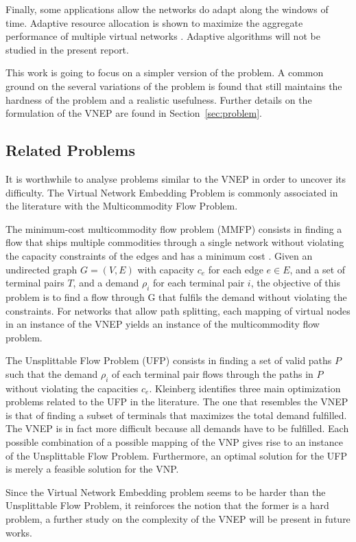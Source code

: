 Finally, some applications allow the networks do adapt along the windows of time. Adaptive resource allocation is shown to maximize the aggregate performance of multiple virtual networks \cite{He:2008}. Adaptive algorithms will not be studied in the present report.

This work is going to focus on a simpler version of the problem. A common ground on the several variations of the problem is found that still maintains the hardness of the problem and a realistic usefulness. Further details on the formulation of the VNEP are found in Section~\ref{sec:problem}.


\subsection{Related Problems}
It is worthwhile to analyse problems similar to the VNEP in order to uncover its difficulty. The Virtual Network Embedding Problem is commonly associated in the literature with the Multicommodity Flow Problem.

The minimum-cost multicommodity flow problem (MMFP) consists in finding a flow that ships multiple commodities through a single network without violating the capacity constraints of the edges and has a minimum cost \cite{Goldberg1998}. Given an undirected graph $G = (V,E)$ with capacity $c_{e}$ for each edge $e \in E$, and a set of terminal pairs $T$, and a demand $\rho_{i}$ for each terminal pair $i$, the objective of this problem is to find a flow through G that fulfils the demand without violating the constraints. For networks that allow path splitting, each mapping of virtual nodes in an instance of the VNEP yields an instance of the multicommodity flow problem. 

The Unsplittable Flow Problem (UFP) consists in finding a set of valid paths $P$ such that the demand $\rho_{i}$ of each terminal pair flows through the paths in $P$ without violating the capacities $c_{e}$. Kleinberg \cite{Kleinberg96} identifies three main optimization problems related to the UFP in the literature. The one that resembles the VNEP is that of finding a subset of terminals that maximizes the total demand fulfilled. The VNEP is in fact more difficult because all demands have to be fulfilled. Each possible combination of a possible mapping of the VNP gives rise to an instance of the Unsplittable Flow Problem. Furthermore, an optimal solution for the UFP is merely a feasible solution for the VNP.

Since the Virtual Network Embedding problem seems to be harder than the Unsplittable Flow Problem, it reinforces the notion that the former is a hard problem, a further study on the complexity of the VNEP will be present in future works.

